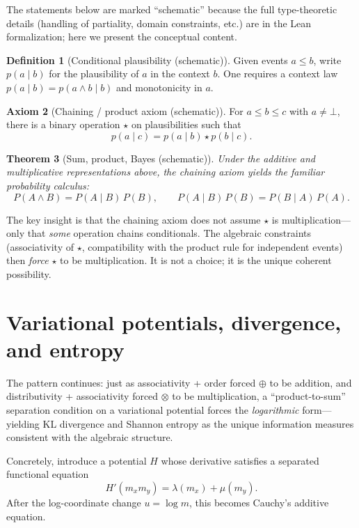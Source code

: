 \documentclass[11pt]{article}
\newtheorem{theorem}{Theorem}[section]
\theoremstyle{definition}
\newtheorem{definition}[theorem]{Definition}
\newtheorem{axiom}[theorem]{Axiom}
\theoremstyle{remark}
\begin{document}
The statements below are marked ``schematic'' because the full type-theoretic details (handling
of partiality, domain constraints, etc.) are in the Lean formalization; here we present the
conceptual content.

\begin{definition}[Conditional plausibility (schematic)]
Given events $a\le b$, write $p(a\mid b)$ for the plausibility of $a$ in the context $b$.
One requires a context law $p(a\mid b)=p(a\wedge b\mid b)$ and monotonicity in $a$.
\end{definition}

\begin{axiom}[Chaining / product axiom (schematic)]
For $a\le b\le c$ with $a\ne \bot$, there is a binary operation $\star$ on plausibilities such that
\[
p(a\mid c) = p(a\mid b)\star p(b\mid c).
\]
\end{axiom}

\begin{theorem}[Sum, product, Bayes (schematic)]
Under the additive and multiplicative representations above, the chaining axiom yields the familiar
probability calculus:
\[
P(A\wedge B)=P(A\mid B)\,P(B),
\qquad
P(A\mid B)\,P(B)=P(B\mid A)\,P(A).
\]
\end{theorem}

The key insight is that the chaining axiom does not assume $\star$ is multiplication---only
that \emph{some} operation chains conditionals.  The algebraic constraints (associativity of $\star$,
compatibility with the product rule for independent events) then \emph{force} $\star$ to be
multiplication.  It is not a choice; it is the unique coherent possibility.

\section{Variational potentials, divergence, and entropy}
\label{sec:variational}

The pattern continues: just as associativity + order forced $\oplus$ to be addition, and
distributivity + associativity forced $\otimes$ to be multiplication, a ``product-to-sum''
separation condition on a variational potential forces the \emph{logarithmic} form---yielding
KL divergence and Shannon entropy as the unique information measures consistent with
the algebraic structure.

Concretely, introduce a potential $H$ whose derivative satisfies a separated functional equation
\[
H'(m_x m_y) = \lambda(m_x) + \mu(m_y).
\]
After the log-coordinate change $u=\log m$, this becomes Cauchy's additive equation.
\end{document}
